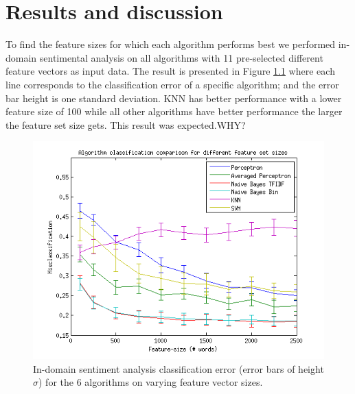 \chapter{Results and discussion}
To find the feature sizes for which each algorithm performs best we performed in-domain sentimental analysis on all algorithms with 11 pre-selected different feature vectors as input data. The result is presented in Figure \ref{fig:featuresize} where each line corresponds to the classification error of a specific algorithm; and the error bar height is one standard deviation. KNN has better performance with a lower feature size of 100 while all other algorithms have better performance the larger the feature set size gets. This result was expected.WHY?
\begin{figure}[h!]
\centering
\includegraphics[width=1\linewidth]{../Plottar/feature-size100-2500all.png}
\caption{In-domain sentiment analysis classification error (error bars of height $\sigma$) for the 6 algorithms on varying feature vector sizes.}
\label{fig:featuresize}
\end{figure}

